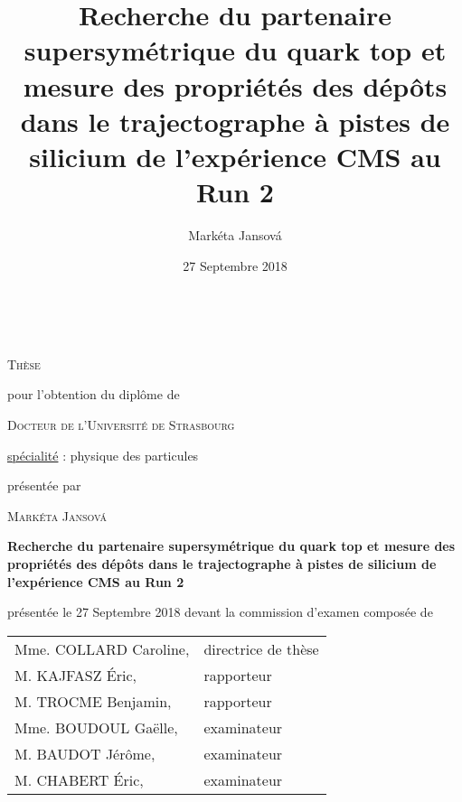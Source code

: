 
\title{Recherche du partenaire supersymétrique du quark top et mesure des propriétés des dépôts dans le trajectographe à pistes de silicium de l’expérience CMS au Run 2}
\author{Mark\'{e}ta Jansov\'{a}}
\date{27 Septembre 2018}



\begin{titlepage}
    \vspace*{1cm}
    \begin{center}
        \\

        \vspace*{0.8cm}

        {\Large \textsc{Thèse}}

        \vspace*{0.8cm}

        pour l'obtention du diplôme de

        \vspace*{0.8cm}

        {\Large \textsc{Docteur de l'Université de Strasbourg}}

        \vspace*{0.8cm}

        \underline{spécialité} : physique des particules

        \vspace*{0.8cm}

        présentée par

        \textsc{Mark\'{e}ta Jansov\'{a}}

        \vspace*{0.8cm}

        {\Large \textbf{Recherche du partenaire supersymétrique du quark top et mesure des propriétés des dépôts dans le trajectographe à pistes de silicium de l’expérience CMS au Run 2}} %

        \vspace*{0.8cm}

        présentée le 27 Septembre 2018 devant la commission d'examen composée de

        \vspace*{0.8cm}

        \begin{tabular}{ll}
            Mme. COLLARD Caroline,          & directrice de thèse\\
            M. KAJFASZ Éric,                & rapporteur\\
            M. TROCME Benjamin,             & rapporteur \\
            Mme. BOUDOUL Gaëlle,            & examinateur\\
            M. BAUDOT Jérôme,               & examinateur\\
            M. CHABERT Éric,                & examinateur\\
        \end{tabular}


\end{center}
\end{titlepage}

